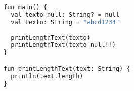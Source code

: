 \begin{lstlisting}[language=Python]
fun main() {
  val texto_null: String? = null
  val texto: String = "abcd1234"
	
  printLengthText(texto)
  printLengthText(texto_null!!)
}

fun printLengthText(text: String) {
  println(text.length)
}
\end{lstlisting}